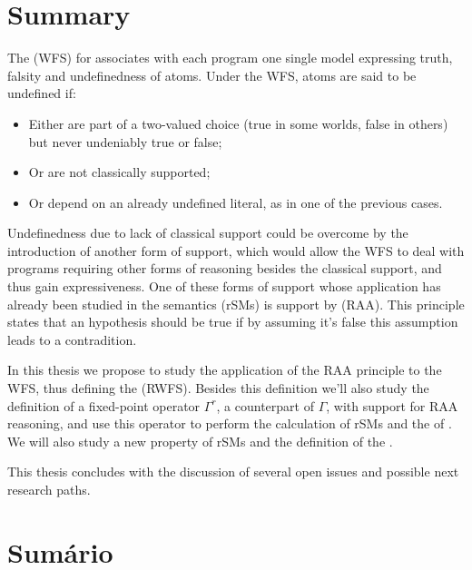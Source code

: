 \chapter*{Summary}

The \WFS(WFS) for \nlps associates with each program one single model expressing truth, falsity and undefinedness of atoms. Under the WFS, atoms are said to be undefined if:

\begin{itemize}
	\item Either are part of a two-valued choice (true in some worlds, false in others) but never undeniably true or false;
	\item Or are not classically supported;
	\item Or depend on an already undefined literal, as in one of the previous cases.
\end{itemize}

Undefinedness due to lack of classical support could be overcome by the introduction of another form of support, which would allow the WFS to deal with programs requiring other forms of reasoning besides the classical support, and thus gain expressiveness. One of these forms of support whose application has already been studied in the \RSMs semantics (rSMs) is support by \raa (RAA). This principle states that an hypothesis should be true if by assuming it's false this assumption leads to a contradition.

In this thesis we propose to study the application of the RAA principle to the WFS, thus defining the \RWFS (RWFS). Besides this definition we'll also study the definition of a fixed-point operator $\Gamma^{r}$, a counterpart of \GFo $\Gamma$, with support for RAA reasoning, and use this operator to perform the calculation of rSMs and the \rwfm of \nlps. We will also study a new property of rSMs and the definition of the \rpsms.

This thesis concludes with the discussion of several open issues and possible next research paths.



\chapter*{Sumário}


